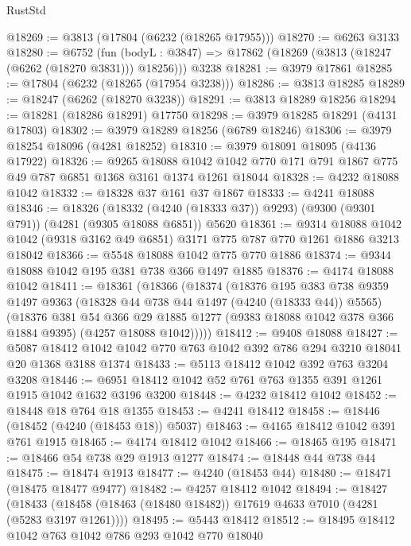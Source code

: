 \begin{lexlean}{RustStd}
\begin{coremodule}
@18269 := @3813 (@17804 (@6232 (@18265 @17955)))
@18270 := @6263 @3133
@18280 := @6752
    (fun (bodyL : @3847) => @17862 (@18269 (@3813 (@18247 (@6262 (@18270 @3831))) @18256)))
    @3238
@18281 := @3979 @17861
@18285 := @17804 (@6232 (@18265 (@17954 @3238)))
@18286 := @3813 @18285
@18289 := @18247 (@6262 (@18270 @3238))
@18291 := @3813 @18289 @18256
@18294 := @18281 (@18286 @18291) @17750
@18298 := @3979 @18285 @18291 (@4131 @17803)
@18302 := @3979 @18289 @18256 (@6789 @18246)
@18306 := @3979 @18254 @18096 (@4281 @18252)
@18310 := @3979 @18091 @18095 (@4136 @17922)
@18326 := @9265
    @18088
    @1042
    @1042
    @770
    @171
    @791
    @1867
    @775
    @49
    @787
    @6851
    @1368
    @3161
    @1374
    @1261
    @18044
@18328 := @4232 @18088 @1042
@18332 := @18328 @37 @161 @37 @1867
@18333 := @4241 @18088
@18346 := @18326
    (@18332 (@4240 (@18333 @37)) @9293)
    (@9300 (@9301 @791))
    (@4281 (@9305 @18088 @6851))
    @5620
@18361 := @9314
    @18088
    @1042
    @1042
    (@9318 @3162 @49 @6851)
    @3171
    @775
    @787
    @770
    @1261
    @1886
    @3213
    @18042
@18366 := @5548 @18088 @1042 @775 @770 @1886
@18374 := @9344 @18088 @1042 @195 @381 @738 @366 @1497 @1885
@18376 := @4174 @18088 @1042
@18411 := @18361
    (@18366
      (@18374
        (@18376
          @195
          @383
          @738
          @9359
          @1497
          @9363
          (@18328 @44 @738 @44 @1497 (@4240 (@18333 @44)) @5565)
          (@18376
            @381
            @54
            @366
            @29
            @1885
            @1277
            (@9383 @18088 @1042 @378 @366 @1884 @9395)
            (@4257 @18088 @1042)))))
@18412 := @9408 @18088
@18427 := @5087 @18412 @1042 @1042 @770 @763 @1042 @392 @786 @294 @3210 @18041 @20 @1368 @3188 @1374
@18433 := @5113 @18412 @1042 @392 @763 @3204 @3208
@18446 := @6951 @18412 @1042 @52 @761 @763 @1355 @391 @1261 @1915 @1042 @1632 @3196 @3200
@18448 := @4232 @18412 @1042
@18452 := @18448 @18 @764 @18 @1355
@18453 := @4241 @18412
@18458 := @18446 (@18452 (@4240 (@18453 @18)) @5037)
@18463 := @4165 @18412 @1042 @391 @761 @1915
@18465 := @4174 @18412 @1042
@18466 := @18465 @195
@18471 := @18466 @54 @738 @29 @1913 @1277
@18474 := @18448 @44 @738 @44
@18475 := @18474 @1913
@18477 := @4240 (@18453 @44)
@18480 := @18471 (@18475 @18477 @9477)
@18482 := @4257 @18412 @1042
@18494 := @18427
    (@18433 (@18458 (@18463 (@18480 @18482)) @17619 @4633 @7010 (@4281 (@5283 @3197 @1261))))
@18495 := @5443 @18412
@18512 := @18495
    @18412
    @1042
    @763
    @1042
    @786
    @293
    @1042
    @770
    @18040

\end{coremodule}
\end{lexlean}

